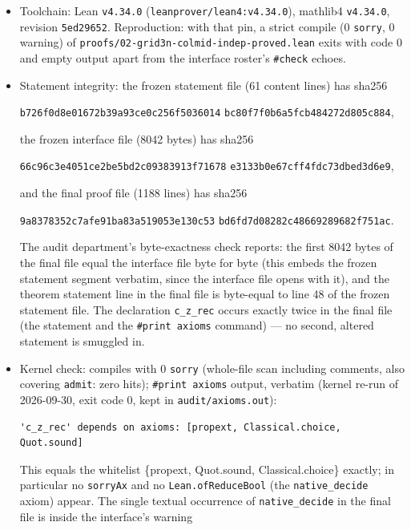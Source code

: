 \documentclass[11pt]{article}
\begin{document}
\begin{itemize}
\item Toolchain: Lean \texttt{v4.34.0} (\texttt{leanprover/lean4:v4.34.0}),
mathlib4 \texttt{v4.34.0}, revision \texttt{5ed29652}. Reproduction: with
that pin, a strict compile (0 \texttt{sorry}, 0 warning) of
\texttt{proofs/02-grid3n-colmid-}\allowbreak\texttt{indep-proved.lean}
exits with code $0$ and
empty output apart from the interface roster's \texttt{\#check} echoes.
\item Statement integrity: the frozen statement file (61 content lines) has sha256
\begin{center}
\texttt{b726f0d8e01672b39a93ce0c256f5036014}\allowbreak
\texttt{bc80f7f0b6a5fcb484272d805c884},
\end{center}
the frozen interface file (8042 bytes) has sha256
\begin{center}
\texttt{66c96c3e4051ce2be5bd2c09383913f71678}\allowbreak
\texttt{e3133b0e67cff4fdc73dbed3d6e9},
\end{center}
and the final proof file (1188 lines) has sha256
\begin{center}
\texttt{9a8378352c7afe91ba83a519053e130c53}\allowbreak
\texttt{bd6fd7d08282c48669289682f751ac}.
\end{center}
The audit department's byte-exactness check reports: the first 8042 bytes of
the final file equal the interface file byte for byte (this embeds the
frozen statement segment verbatim, since the interface file opens with it),
and the theorem statement line in the final file is byte-equal to line 48 of
the frozen statement file. The declaration \texttt{c\_z\_rec} occurs exactly
twice in the final file (the statement and the \texttt{\#print axioms}
command) --- no second, altered statement is smuggled in.
\item Kernel check: compiles with $0$ \texttt{sorry} (whole-file scan
including comments, also covering \texttt{admit}: zero hits);
\texttt{\#print axioms} output, verbatim (kernel re-run of 2026-09-30,
exit code 0, kept in \texttt{audit/axioms.out}):
\begin{lstlisting}[basicstyle=\ttfamily\footnotesize,frame=none]
'c_z_rec' depends on axioms: [propext, Classical.choice, Quot.sound]
\end{lstlisting}
This equals the whitelist \{propext, Quot.sound, Classical.choice\} exactly;
in particular no \texttt{sorryAx} and no \texttt{Lean.ofReduceBool} (the
\texttt{native\_decide} axiom) appear. The single textual occurrence of
\texttt{native\_decide} in the final file is inside the interface's warning

\end{itemize}
\end{document}

